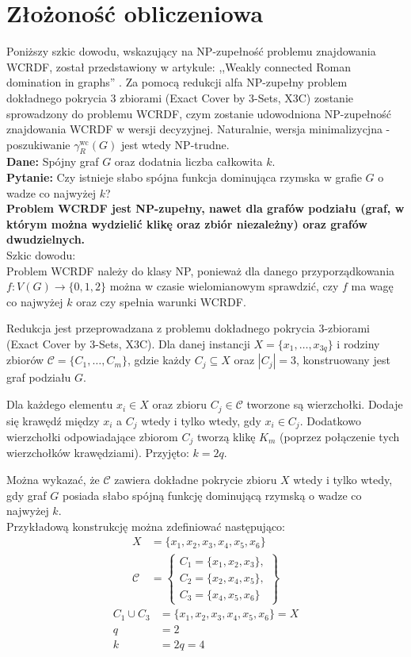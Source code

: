\section{Złożoność obliczeniowa}
Poniższy szkic dowodu, wskazujący na NP-zupełność problemu znajdowania WCRDF, został przedstawiony w artykule: ,,Weakly connected Roman domination in graphs'' \cite{theoryWCRDF}. 
Za pomocą redukcji alfa NP-zupełny problem dokładnego pokrycia 3 zbiorami (Exact Cover by 3-Sets, X3C) \cite{X3C} zostanie sprowadzony do problemu WCRDF, czym zostanie udowodniona NP-zupełność znajdowania WCRDF w wersji decyzyjnej. Naturalnie, wersja minimalizycjna - poszukiwanie $\gamma_{R}^{\text{wc}}(G)$ jest wtedy NP-trudne.\\
\textbf{Dane:} Spójny graf $G$ oraz dodatnia liczba całkowita $k$.\\
\textbf{Pytanie:} Czy istnieje słabo spójna funkcja dominująca rzymska w grafie $G$ o wadze co najwyżej $k$?\\

\textbf{Problem WCRDF jest NP-zupełny, nawet dla grafów podziału (graf, w którym można wydzielić klikę oraz zbiór niezależny) oraz grafów dwudzielnych.}\\

Szkic dowodu:\\
Problem WCRDF należy do klasy NP, ponieważ dla danego przyporządkowania $f : V(G) \rightarrow \{0, 1, 2\}$ można w czasie wielomianowym sprawdzić, czy $f$ ma wagę co najwyżej $k$ oraz czy spełnia warunki WCRDF.

Redukcja jest przeprowadzana z problemu dokładnego pokrycia 3-zbiorami (Exact Cover by 3-Sets, X3C). Dla danej instancji $X = \{x_1, \dots, x_{3q}\}$ i rodziny zbiorów $\mathcal{C} = \{C_1, \dots, C_m\}$, gdzie każdy $C_j \subseteq X$ oraz $|C_j| = 3$, konstruowany jest graf podziału $G$.

Dla każdego elementu $x_i \in X$ oraz zbioru $C_j \in \mathcal{C}$ tworzone są wierzchołki. Dodaje się krawędź między $x_i$ a $C_j$ wtedy i tylko wtedy, gdy $x_i \in C_j$. Dodatkowo wierzchołki odpowiadające zbiorom $C_j$ tworzą klikę $K_m$ (poprzez połączenie tych wierzchołków krawędziami). Przyjęto: $k = 2q$.

Można wykazać, że $\mathcal{C}$ zawiera dokładne pokrycie zbioru $X$ wtedy i tylko wtedy, gdy graf $G$ posiada słabo spójną funkcję dominującą rzymską o wadze co najwyżej $k$.\\

Przykładową konstrukcję można zdefiniować następująco:
\begin{align*}
X &= \{x_1, x_2, x_3, x_4, x_5, x_6\} \\
\mathcal{C} &= \left\{
\begin{array}{l}
C_1 = \{x_1, x_2, x_3\}, \\
C_2 = \{x_2, x_4, x_5\}, \\
C_3 = \{x_4, x_5, x_6\}
\end{array}
\right\}
\end{align*}
\begin{align*}
C_1 \cup C_3 &= \{x_1, x_2, x_3, x_4, x_5, x_6\} = X \\
q &= 2 \\
k &= 2q = 4
\end{align*}

